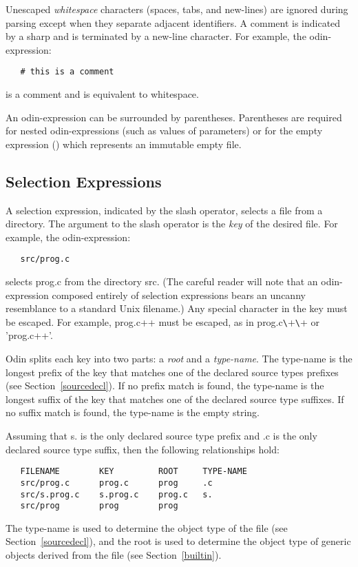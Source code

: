 Unescaped {\em whitespace} characters (spaces, tabs, and new-lines)
are ignored during parsing except when they separate adjacent identifiers.
A comment is indicated by
a sharp and is terminated by a new-line character.
For example, the odin-expression:
\begin{verbatim}
   # this is a comment
\end{verbatim}
is a comment and is equivalent to whitespace.

An odin-expression can be surrounded by parentheses.
Parentheses are required for nested odin-expressions
(such as values of parameters) or for the empty expression
{\ex ()} which represents an immutable empty file.

\subsection{Selection Expressions}
\label{selection}

A selection expression, indicated by the slash operator,
selects a file from a directory.
The argument to the slash operator is the {\em key} of the desired file.
For example, the odin-expression:
\begin{verbatim}
   src/prog.c
\end{verbatim}
selects {\ex prog.c} from the directory {\ex src}.
(The careful reader will note that an odin-expression composed entirely
of selection expressions bears an uncanny resemblance to a standard
Unix filename.)
Any special character in the key must be escaped.
For example, {\ex prog.c++} 
must be escaped, as in {\ex prog.c\verb.\.+\verb.\.+} or {\ex 'prog.c++'}.

Odin splits each key into two parts: a {\em root} and a {\em type-name}.
The type-name is the longest prefix of the key
that matches one of the declared source types prefixes
(see Section~\ref{sourcedecl}).
If no prefix match is found, the type-name is the longest suffix of the
key that matches one of the declared source type suffixes.
If no suffix match is found, the type-name is the empty string.

Assuming that {\ex s.} is the only declared source type prefix and
{\ex .c} is the only declared source type suffix, then the following
relationships hold:
\begin{verbatim}
   FILENAME        KEY         ROOT     TYPE-NAME
   src/prog.c      prog.c      prog     .c
   src/s.prog.c    s.prog.c    prog.c   s.
   src/prog        prog        prog 
\end{verbatim}
The type-name is used to determine the object type of the file
(see Section~\ref{sourcedecl}),
and the root is used to determine the object type of generic
objects derived from the file (see Section~\ref{builtin}).

